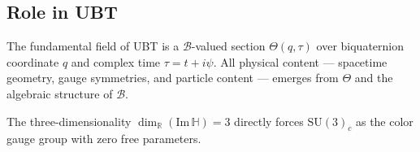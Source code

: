\subsection{Role in UBT}

The fundamental field of UBT is a $\mathcal{B}$-valued section
$\Theta(q, \tau)$ over biquaternion coordinate $q$ and complex time
$\tau = t + i\psi$.  All physical content — spacetime geometry, gauge symmetries,
and particle content — emerges from $\Theta$ and the algebraic structure of
$\mathcal{B}$.

The three-dimensionality $\dim_{\mathbb{R}}(\mathrm{Im}\,\mathbb{H}) = 3$ directly
forces $\mathrm{SU}(3)_c$ as the color gauge group with zero free parameters.


